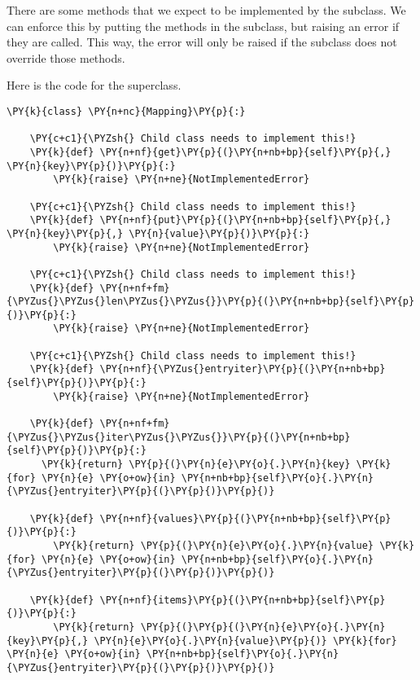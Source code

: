 There are some methods that we expect to be implemented by the subclass.  We can enforce this by putting the methods in the subclass, but raising an error if they are called.   This way, the error will only be raised if the subclass does not override those methods.


Here is the code for the superclass.

\begin{Verbatim}[commandchars=\\\{\}]
\PY{k}{class} \PY{n+nc}{Mapping}\PY{p}{:}

    \PY{c+c1}{\PYZsh{} Child class needs to implement this!}
    \PY{k}{def} \PY{n+nf}{get}\PY{p}{(}\PY{n+nb+bp}{self}\PY{p}{,} \PY{n}{key}\PY{p}{)}\PY{p}{:}
        \PY{k}{raise} \PY{n+ne}{NotImplementedError}

    \PY{c+c1}{\PYZsh{} Child class needs to implement this!}
    \PY{k}{def} \PY{n+nf}{put}\PY{p}{(}\PY{n+nb+bp}{self}\PY{p}{,} \PY{n}{key}\PY{p}{,} \PY{n}{value}\PY{p}{)}\PY{p}{:}
        \PY{k}{raise} \PY{n+ne}{NotImplementedError}

    \PY{c+c1}{\PYZsh{} Child class needs to implement this!}
    \PY{k}{def} \PY{n+nf+fm}{\PYZus{}\PYZus{}len\PYZus{}\PYZus{}}\PY{p}{(}\PY{n+nb+bp}{self}\PY{p}{)}\PY{p}{:}
        \PY{k}{raise} \PY{n+ne}{NotImplementedError}

    \PY{c+c1}{\PYZsh{} Child class needs to implement this!}
    \PY{k}{def} \PY{n+nf}{\PYZus{}entryiter}\PY{p}{(}\PY{n+nb+bp}{self}\PY{p}{)}\PY{p}{:}
        \PY{k}{raise} \PY{n+ne}{NotImplementedError}   

    \PY{k}{def} \PY{n+nf+fm}{\PYZus{}\PYZus{}iter\PYZus{}\PYZus{}}\PY{p}{(}\PY{n+nb+bp}{self}\PY{p}{)}\PY{p}{:}
      \PY{k}{return} \PY{p}{(}\PY{n}{e}\PY{o}{.}\PY{n}{key} \PY{k}{for} \PY{n}{e} \PY{o+ow}{in} \PY{n+nb+bp}{self}\PY{o}{.}\PY{n}{\PYZus{}entryiter}\PY{p}{(}\PY{p}{)}\PY{p}{)}

    \PY{k}{def} \PY{n+nf}{values}\PY{p}{(}\PY{n+nb+bp}{self}\PY{p}{)}\PY{p}{:}
        \PY{k}{return} \PY{p}{(}\PY{n}{e}\PY{o}{.}\PY{n}{value} \PY{k}{for} \PY{n}{e} \PY{o+ow}{in} \PY{n+nb+bp}{self}\PY{o}{.}\PY{n}{\PYZus{}entryiter}\PY{p}{(}\PY{p}{)}\PY{p}{)}

    \PY{k}{def} \PY{n+nf}{items}\PY{p}{(}\PY{n+nb+bp}{self}\PY{p}{)}\PY{p}{:}
        \PY{k}{return} \PY{p}{(}\PY{p}{(}\PY{n}{e}\PY{o}{.}\PY{n}{key}\PY{p}{,} \PY{n}{e}\PY{o}{.}\PY{n}{value}\PY{p}{)} \PY{k}{for} \PY{n}{e} \PY{o+ow}{in} \PY{n+nb+bp}{self}\PY{o}{.}\PY{n}{\PYZus{}entryiter}\PY{p}{(}\PY{p}{)}\PY{p}{)}


\end{Verbatim}
